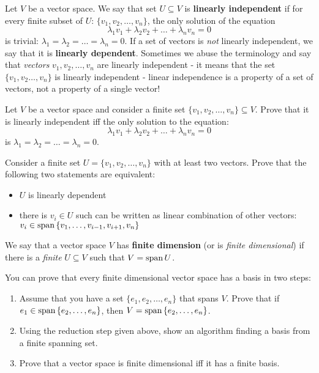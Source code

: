 \begin{definition}
  Let $V$ be a vector space. We say that set $U\subseteq V$ is \textbf{linearly independent} if for every finite subset of $U$: $\{v_1, v_2, \dots, v_n\}$,
  the only solution of the equation
  $$\lambda_1v_1+\lambda_2v_2+\dots+\lambda_nv_n=0$$
  is trivial: $\lambda_1=\lambda_2=\dots=\lambda_n=0$.
  If a set of vectors is \textit{not} linearly independent, we say that it is \textbf{linearly dependent}.
  Sometimes we abuse the terminology and say that \textit{vectors} $v_1, v_2, \dots, v_n$ are linearly independent - it means that the set $\{v_1,v_2\dots, v_n\}$ is linearly
  independent - linear independence is a property of a set of vectors, not a property of a single vector!
\end{definition}

\begin{exercise}
  Let $V$ be a vector space and consider a finite set $\{v_1, v_2, \dots, v_n\}\subseteq V$. Prove that it is linearly independent iff the only solution to the equation:
  $$\lambda_1v_1+\lambda_2v_2+\dots+\lambda_nv_n=0$$
  is $\lambda_1=\lambda_2=\dots=\lambda_n=0$.
\end{exercise}

\begin{exercise}
  Consider a finite set $U=\{v_1, v_2, \dots, v_n\}$ with at least two vectors. Prove that the following two statements are equivalent:
  \begin{itemize}
    \item $U$ is linearly dependent
    \item there is $v_i\in U$ such can be written as linear combination of other vectors: $v_i \in \text{span\,} \{v_1, \dots, v_{i-1}, v_{i+1}, v_n\}$
  \end{itemize}
\end{exercise}

\begin{definition}
  We say that a vector space $V$ has \textbf{finite dimension} (or is \textit{finite dimensional}) if there is a \textit{finite} $U\subseteq V$ such that $V=\text{span\,} U$.
\end{definition}

\begin{exercise}
  You can prove that every finite dimensional vector space has a basis in two steps:
    \begin{enumerate}
      \item Assume that you have a set $\{e_1, e_2,\dots, e_n\}$ that spans $V$. Prove that if $e_1\in \text{span\,} \{e_2,\dots, e_n\}$, then $V=\text{span\,} \{e_2,\dots, e_n\}$.
      \item Using the reduction step given above, show an algorithm finding a basis from a finite spanning set.
      \item Prove that a vector space is finite dimensional iff it has a finite basis.
    \end{enumerate}
\end{exercise}

